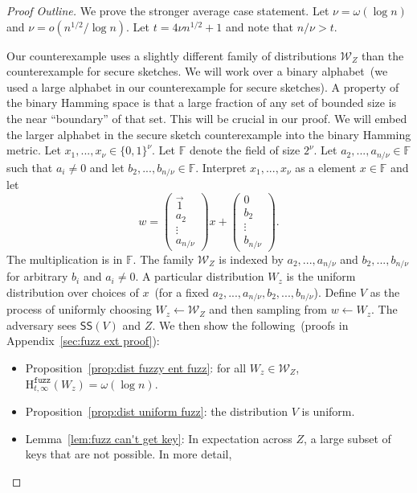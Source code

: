 \documentclass[11pt]{article}
\newcommand{\apref}[1]{\mbox{Appendix~\ref{#1}}}
\newcommand{\lemref}[1]{\mbox{Lemma~\ref{#1}}}
\newcommand{\propref}[1]{\mbox{Proposition~\ref{#1}}}
\newcommand{\class}[1]{{\ensuremath{\mathsf{#1}}}}
\newcommand{\sketch}{\ensuremath{\class{SS}}\xspace}
\newcommand{\zo}{\ensuremath{\{0, 1\}}}
\newcommand{\Hfuzz}{\mathrm{H}^{\mathtt{fuzz}}_{t,\infty}}
\begin{document}
\begin{proof}[Proof Outline]
We prove the stronger average case statement.
Let $\nu = \omega(\log n)$ and $\nu = o(n^{1/2}/\log n)$.  Let $t=4\nu n^{1/2}+1$ and note that $n/\nu >t$.  

Our counterexample uses a slightly different family of distributions $\mathcal{W}_Z$ than the counterexample for secure sketches.  
We will work over a binary alphabet~(we used a large alphabet in our counterexample for secure sketches).  A  property of the binary Hamming space is that a large fraction of any set of bounded size is the near ``boundary'' of that set.  This will be crucial in our proof.  We will embed the larger alphabet in the secure sketch counterexample into the binary Hamming metric.
Let $x_1,..., x_\nu \in \zo^\nu$.  Let $\mathbb{F}$ denote the field of size $2^{\nu}$.  Let $a_2,..., a_{n/\nu}\in\mathbb{F}$ such that $a_i\neq 0$ and let $b_2,..., b_{n/\nu}\in\mathbb{F}$.  
Interpret $x_1,..., x_{\nu}$ as a element $x\in \mathbb{F}$ and let 
\[w =  \begin{pmatrix} \vec{1} \\a_2  \\ \vdots \\ a_{n/\nu} \end{pmatrix} x + \begin{pmatrix} 0  \\ 
b_2\\ \vdots \\ b_{n/\nu} \end{pmatrix} .
\]
The multiplication is in $\mathbb{F}$.  The family $\mathcal{W}_Z$ is indexed by $a_2,..., a_{n/\nu}$ and $b_2,..., b_{n/\nu}$ for arbitrary $b_i$ and $a_i\neq 0$.  
A particular distribution $W_z$ is the uniform distribution over choices of $x$~(for a fixed $a_2,..., a_{n/\nu}, b_2,..., b_{n/\nu}$).
 Define $V$ as the process of uniformly choosing $W_z\leftarrow \mathcal{W}_Z$ and then sampling from $w\leftarrow W_z$.  The adversary sees $\sketch(V)$  and $Z$.  We then show the following~(proofs in \apref{sec:fuzz ext proof}):
\begin{itemize}
\item \propref{prop:dist fuzzy ent fuzz}: for all $W_z\in \mathcal{W}_Z$, $\Hfuzz(W_z) = \omega (\log n)$. 
\item \propref{prop:dist uniform fuzz}: the distribution $V$ is uniform.
\item \lemref{lem:fuzz can't get key}: In expectation across $Z$, a large subset of keys that are not possible.  In more detail,

\end{itemize}
\end{proof}
\end{document}
